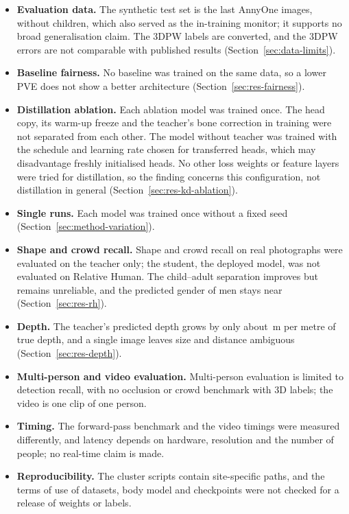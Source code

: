 \begin{itemize}
\item \textbf{Evaluation data.} The synthetic test set is the last \MethodHoldoutN{} AnnyOne images, without
  children, which also served as the in-training monitor; it supports no broad generalisation claim. The 3DPW labels
  are converted, and the 3DPW errors are not comparable with published results (Section~\ref{sec:data-limits}).
\item \textbf{Baseline fairness.} No baseline was trained on the same data, so a lower PVE does not show a better
  architecture (Section~\ref{sec:res-fairness}).
\item \textbf{Distillation ablation.} Each ablation model was trained once. The head copy, its warm-up freeze and
  the teacher's bone correction in training were not separated from each other. The model without teacher was
  trained with the schedule and learning rate chosen for transferred heads, which may disadvantage freshly
  initialised heads. No other loss weights or feature layers were tried for distillation, so the finding concerns
  this configuration, not distillation in general (Section~\ref{sec:res-kd-ablation}).
\item \textbf{Single runs.} Each model was trained once without a fixed seed (Section~\ref{sec:method-variation}).
\item \textbf{Shape and crowd recall.} Shape and crowd recall on real photographs were evaluated on the teacher
  only; the student, the deployed model, was not evaluated on Relative Human. The child--adult separation improves but remains unreliable, and the predicted gender of men
  stays near \RHMenGenderFinal{} (Section~\ref{sec:res-rh}).
\item \textbf{Depth.} The teacher's predicted depth grows by only about \FinalSlope\,m per metre of true depth, and a single image leaves
  size and distance ambiguous (Section~\ref{sec:res-depth}).
\item \textbf{Multi-person and video evaluation.} Multi-person evaluation is limited to detection recall, with no
  occlusion or crowd benchmark with 3D labels; the video is one clip of one person.
\item \textbf{Timing.} The forward-pass benchmark and the video timings were measured differently, and latency
  depends on hardware, resolution and the number of people; no real-time claim is made.
\item \textbf{Reproducibility.} The cluster scripts contain site-specific paths, and the terms of use of datasets,
  body model and checkpoints were not checked for a release of weights or labels.
\end{itemize}
